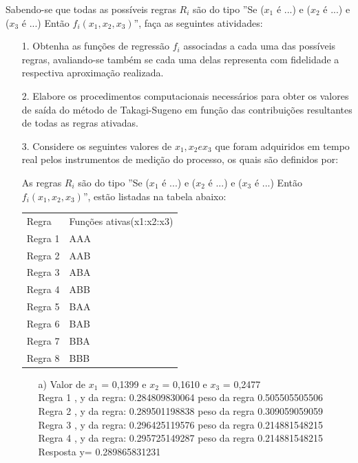 \documentclass{report}
\begin{document}
Sabendo-se que todas as possíveis regras $R_i$ são do tipo ''Se ($x_1$ é ...) e ($x_2$ é ...) e ($x_3$ é ...)
Então $f_i(x_1, x_2, x_3)$'', faça as seguintes atividades:

\begin{enumerate}
\item[1.] Obtenha as funções de regressão $f_i$ associadas a cada uma das possíveis regras, avaliando-se
também se cada uma delas representa com fidelidade a respectiva aproximação realizada.
\item[2.] Elabore os procedimentos computacionais necessários para obter os valores de saída do
método de Takagi-Sugeno em função das contribuições resultantes de todas as regras
ativadas.
\item[3.] Considere os seguintes valores de $x_1, x_2 e x_3$ que foram adquiridos em tempo real pelos
instrumentos de medição do processo, os quais são definidos por:

As regras $R_i$ são do tipo ''Se ($x_1$ é ...) e ($x_2$ é ...) e ($x_3$ é ...)
Então $f_i(x_1, x_2, x_3)$'', estão listadas na tabela abaixo:\\

\begin{center}
\begin{tabular}{ll}
Regra & Funções ativas(x1:x2:x3)\\
Regra 1 & AAA\\
Regra 2 & AAB\\
Regra 3 & ABA\\
Regra 4 & ABB\\
Regra 5 & BAA\\
Regra 6 & BAB\\
Regra 7 & BBA\\
Regra 8 & BBB
\end{tabular}
\end{center}

\begin{enumerate}
\item[a)] Valor de $x_1$ = 0,1399 e $x_2$ = 0,1610 e $x_3$ = 0,2477\\
Regra 1 , y da regra: 0.284809830064 peso da regra 0.505505505506 \\
Regra 2 , y da regra: 0.289501198838 peso da regra 0.309059059059 \\
Regra 3 , y da regra: 0.296425119576 peso da regra 0.214881548215 \\
Regra 4 , y da regra: 0.295725149287 peso da regra 0.214881548215 \\
Resposta y= 0.289865831231


\end{enumerate}
\end{enumerate}
\end{document}
